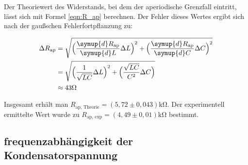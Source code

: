 Der Theoriewert des Widerstands, bei dem der aperiodische Grenzfall eintritt, lässt sich mit Formel \eqref{eqn:R_ap} berechnen.
Der Fehler dieses Wertes ergibt sich nach der gaußschen Fehlerfortpflanzung zu:

\begin{align*}
  \label{eqn:err_R_ap}
  \Delta R_{\text{ap}} &= \sqrt{\Bigl(\frac{\symup{d}R_{\text{ap}}}{\symup{d}L}\Delta L \Bigr)^2+\Bigl(\frac{\symup{d}R_{\text{ap}}}{\symup{d}C}\Delta C\Bigr)^2} \\
  &= \sqrt{\Bigl(\frac{1}{\sqrt{LC}}\Delta L\Bigr)^2+\Bigl(\frac{\sqrt{LC}}{C^2}\Delta C\Bigr)} \\
  &\approx 43 \unit{\ohm}
\end{align*}

Insgesamt erhält man $R_{\text{ap, Theorie}} = (5,72 \pm 0,043) \unit{\kilo\ohm}$. Der experimentell ermittelte Wert wurde 
zu $R_{\text{ap, exp}} = (4,49 \pm 0,01) \unit{\kilo\ohm}$ bestimmt.

\subsection{frequenzabhängigkeit der Kondensatorspannung}
\label{subsec:AuswertungC}


